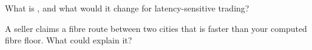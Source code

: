 \begin{interviewq}\label{iq:nw:long-haul-fibre:5}
What is , and what would it change for latency-sensitive trading?
\end{interviewq}

\begin{interviewq}\label{iq:nw:long-haul-fibre:6}
A seller claims a fibre route between two cities that is faster than your computed fibre floor. What could explain it?
\end{interviewq}
